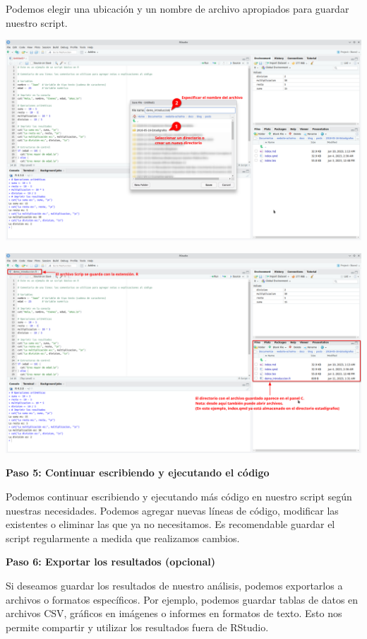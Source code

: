 \documentclass[
  letterpaper,
  DIV=11,
  numbers=noendperiod]{scrartcl}
\begin{document}
Podemos elegir una ubicación y un nombre de archivo apropiados para
guardar nuestro script.

\includegraphics{images/Screenshot_20230611_012736.png}

\includegraphics{images/Screenshot_20230611_013135.png}

\textbf{Paso 5: Continuar escribiendo y ejecutando el código}

Podemos continuar escribiendo y ejecutando más código en nuestro script
según nuestras necesidades. Podemos agregar nuevas líneas de código,
modificar las existentes o eliminar las que ya no necesitamos. Es
recomendable guardar el script regularmente a medida que realizamos
cambios.

\textbf{Paso 6: Exportar los resultados (opcional)}

Si deseamos guardar los resultados de nuestro análisis, podemos
exportarlos a archivos o formatos específicos. Por ejemplo, podemos
guardar tablas de datos en archivos CSV, gráficos en imágenes o informes
en formatos de texto. Esto nos permite compartir y utilizar los
resultados fuera de RStudio.
\end{document}
